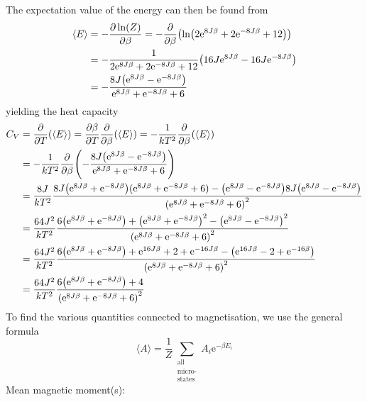 \documentclass[12pt,english,a4paper]{article}
\renewcommand{\exp}[1]{\mathrm{e}^{#1}}
\begin{document}
The expectation value of the energy can then be found from
\begin{alignat*}{2}
    \langle E\rangle &= -\pdv{\ln(Z)}{\beta} = -\pdv{\beta}(\ln(2\exp{8J\beta} + 2\exp{-8J\beta} + 12))\\
    &= -\frac{1}{2\exp{8J\beta} + 2\exp{-8J\beta} + 12}\qty(16J\exp{8J\beta}-16J\exp{-8J\beta})\\
    &= -\frac{8J\qty(\exp{8J\beta}-\exp{-8J\beta})}{\exp{8J\beta}+\exp{-8J\beta}+6}
\end{alignat*}
yielding the heat capacity
\begin{alignat*}{2}
    C_V &= \pdv{T}(\langle E\rangle) = \pdv{\beta}{T}\pdv{\beta}(\langle E\rangle)=-\frac{1}{kT^2}\pdv{\beta}(\langle E\rangle)\\
    &= -\frac{1}{kT^2}\pdv{\beta}(-\frac{8J\qty(\exp{8J\beta}-\exp{-8J\beta})}{\exp{8J\beta}+\exp{-8J\beta}+6})\\
    &= \frac{8J}{kT^2}\frac{8J\qty(\exp{8J\beta}+\exp{-8J\beta})(\exp{8J\beta}+\exp{-8J\beta}+6)-\qty(\exp{8J\beta}-\exp{-8J\beta})8J\qty(\exp{8J\beta}-\exp{-8J\beta})}{\qty(\exp{8J\beta}+\exp{-8J\beta}+6)^2}\\
    &= \frac{64J^2}{kT^2}\frac{6\qty(\exp{8J\beta}+\exp{-8J\beta})+\qty(\exp{8J\beta}+\exp{-8J\beta})^2-\qty(\exp{8J\beta}-\exp{-8J\beta})^2}{\qty(\exp{8J\beta}+\exp{-8J\beta}+6)^2}\\
    &= \frac{64J^2}{kT^2}\frac{6\qty(\exp{8J\beta}+\exp{-8J\beta})+\exp{16J\beta}+2+\exp{-16J\beta}-\qty(\exp{16J\beta}-2+\exp{-16\beta})}{\qty(\exp{8J\beta}+\exp{-8J\beta}+6)^2}\\
    &= \frac{64J^2}{kT^2}\frac{6\qty(\exp{8J\beta}+\exp{-8J\beta})+4}{\qty(\exp{8J\beta}+\exp{-8J\beta}+6)^2}
\end{alignat*}
To find the various quantities connected to magnetisation, we use the general formula
\[
    \langle A\rangle = \frac{1}{Z}\sum_{\substack{\text{all}\\ \text{micro-}\\ \text{states}}}A_i\exp{-\beta E_i}
\]
Mean magnetic moment(s):
\end{document}

